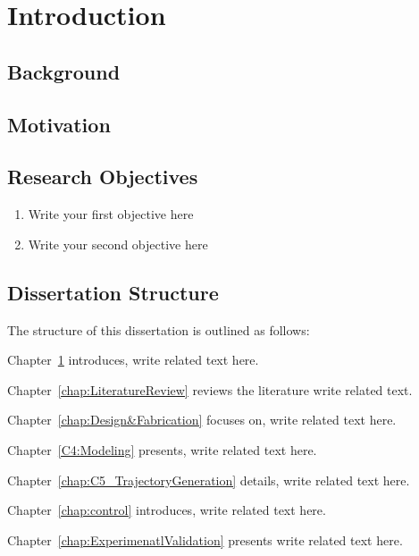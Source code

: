 \chapter{Introduction} \label{chap:intro}

\section{Background} \label{sec:background}
\lipsum[4]
\cite{whitesides2018soft,calisti2017fundamentals,mazzolai2022roadmap,chen2020soft,ahmed2022decade}

\section{Motivation} \label{sec:Motivation}

\lipsum[2-3]
\cite{el2020soft,oshiro2018soft,aracri2021soft}


\section{Research Objectives} \label{sec:research-question}

\lipsum[1]
\begin{enumerate} [i]
	\item{Write your first objective here }
	\item{Write your second objective here }
\end{enumerate} 


\section{Dissertation Structure} \label{sec:reportoutline}

The structure of this dissertation is outlined as follows: 

Chapter~\ref{chap:intro} introduces, write related text here.  

Chapter~\ref{chap:LiteratureReview} reviews the literature write related text.

Chapter~\ref{chap:Design&Fabrication} focuses on, write related text here.


Chapter~\ref{C4:Modeling} presents, write related text here.


Chapter~\ref{chap:C5_TrajectoryGeneration} details, write related text here.

Chapter~\ref{chap:control} introduces, write related text here.


Chapter~\ref{chap:ExperimenatlValidation} presents write related text here. 

